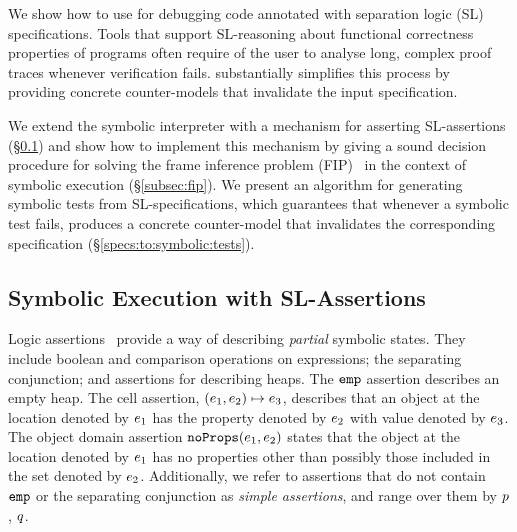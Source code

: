 

\noindent We show how to use \cosette for debugging \jsil code annotated with 
separation logic (SL) specifications. Tools that support SL-reasoning about
functional correctness properties of programs often require of the user to 
analyse long, complex proof traces whenever
verification fails. 
\cosette substantially simplifies this process by providing
concrete counter-models that invalidate the input specification. 


We extend the 
 \jsil symbolic interpreter with a mechanism for asserting
SL-assertions (\S\ref{subsec:sep:assertions}) and show how to 
implement this mechanism by giving a sound decision procedure 
for solving the frame inference problem (FIP)~\cite{}
in the context of symbolic execution (\S\ref{subsec:fip}).
%
%
We present an algorithm  
for generating symbolic tests from SL-specifications, which guarantees 
that whenever a symbolic test fails, \cosette produces a concrete 
counter-model that invalidates the corresponding specification (\S\ref{specs:to:symbolic:tests}).

\vspace{-5pt}
\subsection{Symbolic Execution with SL-Assertions}\label{subsec:sep:assertions}

\jsil Logic assertions~\cite{javert} provide a way of describing \emph{partial} symbolic states.
They include boolean and comparison operations on \jsil expressions; the separating conjunction; 
and assertions for describing heaps. The $\texttt{emp}$ assertion describes 
an empty heap. The cell assertion, $(e_1,e_2) \mapsto e_3$,  describes that an object 
at the location denoted by $e_1$ has the property denoted by $e_2$ with value 
denoted by $e_3$. The object domain assertion $\texttt{noProps}(e_1, e_2)$ states that the object at 
the location denoted by $e_1$ has no properties other than possibly those included in the
set denoted by $e_2$. Additionally, we refer to assertions that do not contain $\texttt{emp}$ or the separating conjunction as \emph{simple assertions}, and range over them by $p$, $q$.


